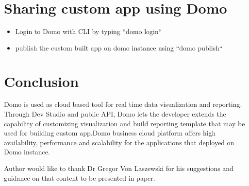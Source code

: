 \section{Sharing custom app using Domo}
\begin{itemize}
\item Login to Domo with CLI by typing ``domo login``
\item publish the custom built app on domo instance
   using ``domo publish``
\end{itemize}


\section{Conclusion}
Domo is used as cloud based tool for real time data visualization and 
reporting. Through Dev Studio and public API, Domo lets the developer
extends the capability of customizing visualization and build reporting
template that may be used for building custom app.Domo business cloud
platform offers high availability, performance and scalability for the
applications that deployed on Domo instance.


\begin{acks}

Author would like to thank Dr Gregor Von Laszewski 
for his suggestions and guidance on that content to be presented
in paper.
\end{acks}


 

